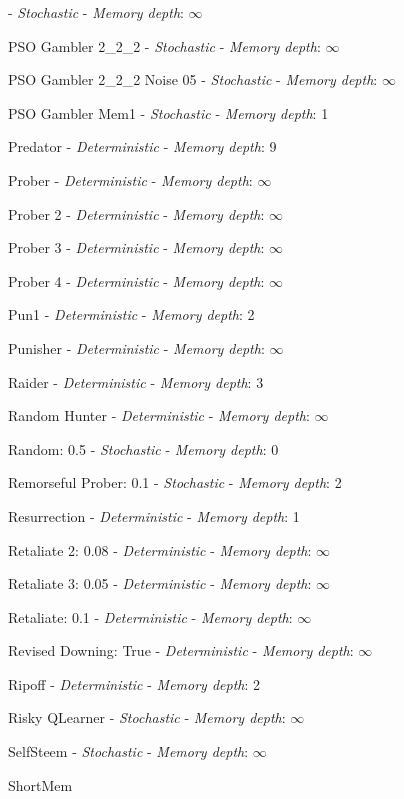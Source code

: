  - \textit{Stochastic} - \textit{Memory depth}: \(\infty\)\item PSO Gambler 2\_2\_2
 - \textit{Stochastic} - \textit{Memory depth}: \(\infty\)\item PSO Gambler 2\_2\_2 Noise 05
 - \textit{Stochastic} - \textit{Memory depth}: \(\infty\)\item PSO Gambler Mem1
 - \textit{Stochastic} - \textit{Memory depth}: 1\item Predator
 - \textit{Deterministic} - \textit{Memory depth}: 9\item Prober
 - \textit{Deterministic} - \textit{Memory depth}: \(\infty\)\item Prober 2
 - \textit{Deterministic} - \textit{Memory depth}: \(\infty\)\item Prober 3
 - \textit{Deterministic} - \textit{Memory depth}: \(\infty\)\item Prober 4
 - \textit{Deterministic} - \textit{Memory depth}: \(\infty\)\item Pun1
 - \textit{Deterministic} - \textit{Memory depth}: 2\item Punisher
 - \textit{Deterministic} - \textit{Memory depth}: \(\infty\)\item Raider
 - \textit{Deterministic} - \textit{Memory depth}: 3\item Random Hunter
 - \textit{Deterministic} - \textit{Memory depth}: \(\infty\)\item Random: 0.5
 - \textit{Stochastic} - \textit{Memory depth}: 0\item Remorseful Prober: 0.1
 - \textit{Stochastic} - \textit{Memory depth}: 2\item Resurrection
 - \textit{Deterministic} - \textit{Memory depth}: 1\item Retaliate 2: 0.08
 - \textit{Deterministic} - \textit{Memory depth}: \(\infty\)\item Retaliate 3: 0.05
 - \textit{Deterministic} - \textit{Memory depth}: \(\infty\)\item Retaliate: 0.1
 - \textit{Deterministic} - \textit{Memory depth}: \(\infty\)\item Revised Downing: True
 - \textit{Deterministic} - \textit{Memory depth}: \(\infty\)\item Ripoff
 - \textit{Deterministic} - \textit{Memory depth}: 2\item Risky QLearner
 - \textit{Stochastic} - \textit{Memory depth}: \(\infty\)\item SelfSteem
 - \textit{Stochastic} - \textit{Memory depth}: \(\infty\)\item ShortMem
